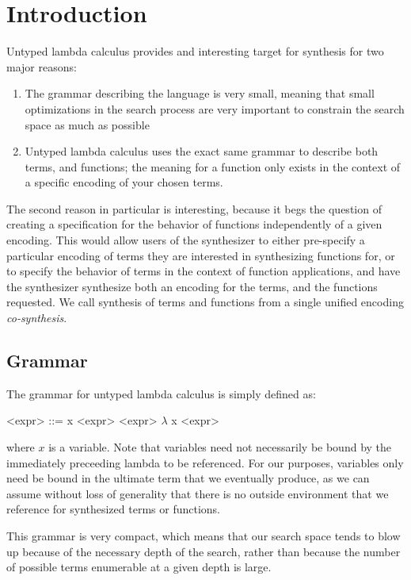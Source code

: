 \section{Introduction} \label{sec:intro}

Untyped lambda calculus provides and interesting target for synthesis for
  two major reasons:
  \begin{enumerate}
    \item The grammar describing the language is very small, meaning that
      small optimizations in the search process are very important to
      constrain the search space as much as possible
    \item Untyped lambda calculus uses the exact same grammar to describe
      both terms, and functions; the meaning for a function only exists
      in the context of a specific encoding of your chosen terms.
  \end {enumerate}
The second reason in particular is interesting, because it begs the
  question of creating a specification for the behavior of functions
  independently of a given encoding.
This would allow users of the synthesizer to either pre-specify a
  particular encoding of terms they are interested in synthesizing
  functions for, or to specify the behavior of terms in the context of
  function applications, and have the synthesizer synthesize both
  an encoding for the terms, and the functions requested.
We call synthesis of terms and functions from a single unified encoding
  \emph{co-synthesis}.

\subsection{Grammar}

The grammar for untyped lambda calculus is simply defined as:
  \begin{grammar}
    <expr> ::= x
      \alt <expr> <expr>
      \alt $\lambda$ x <expr>
  \end{grammar}
  where $x$ is a variable.
Note that variables need not necessarily be bound by the immediately
  preceeding lambda to be referenced.
For our purposes, variables only need be bound in the ultimate term
  that we eventually produce, as we can assume without loss of
  generality that there is no outside environment that we reference
  for synthesized terms or functions.

This grammar is very compact, which means that our search space tends to
  blow up because of the necessary depth of the search, rather than
  because the number of possible terms enumerable at a given depth
  is large.

